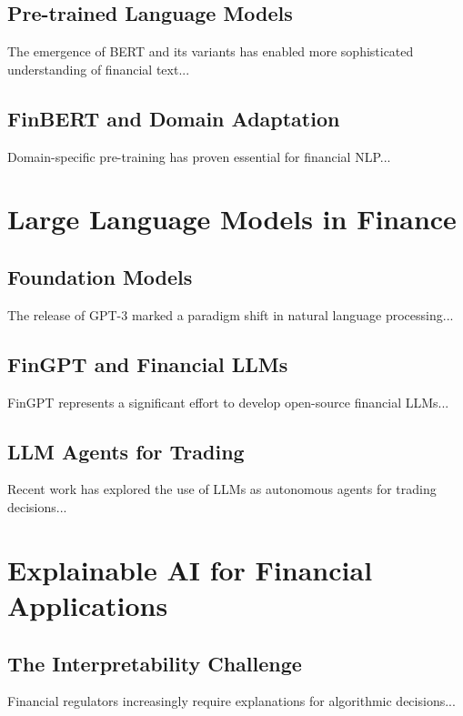 \subsection{Pre-trained Language Models}

The emergence of BERT and its variants has enabled more sophisticated understanding of financial text...

\subsection{FinBERT and Domain Adaptation}

Domain-specific pre-training has proven essential for financial NLP...

\section{Large Language Models in Finance}

\subsection{Foundation Models}

The release of GPT-3 marked a paradigm shift in natural language processing...

\subsection{FinGPT and Financial LLMs}

FinGPT \cite{yang2023fingpt} represents a significant effort to develop open-source financial LLMs...

\subsection{LLM Agents for Trading}

Recent work has explored the use of LLMs as autonomous agents for trading decisions...

\section{Explainable AI for Financial Applications}

\subsection{The Interpretability Challenge}

Financial regulators increasingly require explanations for algorithmic decisions...

